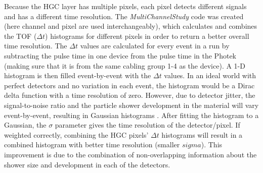 \documentclass[12pt]{article}
\begin{document}
Because the HGC layer has multiple pixels, each pixel detects different signals and has a different time resolution. 
The \textit{MultiChannelStudy} code was created (here channel and pixel are used interchangeably), which calculates and combines the TOF ($\Delta t$) histograms for different pixels in order to return a better overall time resolution. 
The $\Delta t$ values are calculated for every event in a run by subtracting the pulse time in one device from the pulse time in the Photek (making sure that it is from the same cabling group 1-4 as the device). 
A 1-D histogram is then filled event-by-event with the $\Delta t$ values. 
In an ideal world with perfect detectors and no variation in each event, the histogram would be a Dirac delta function with a time resolution of zero. 
However, due to detector jitter, the signal-to-noise ratio and the particle shower development in the material will vary event-by-event, resulting in Gaussian histograms \cite{P2}. 
After fitting the histogram to a Gaussian, the $\sigma$ parameter gives the time resolution of the detector/pixel. 
If weighted correctly, combining the HGC pixels’ $\Delta t$ histograms will result in a combined histogram with better time resolution (smaller $sigma$). 
This improvement is due to the combination of non-overlapping information about the shower size and development in each of the detectors.
\end{document}
